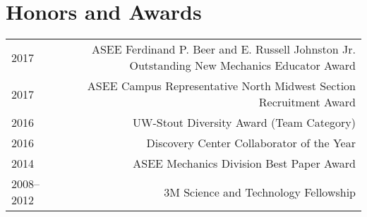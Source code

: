 \section*{Honors and Awards}
\begin{tabular}{L!{\VRule}R}
2017&ASEE Ferdinand P. Beer and E. Russell Johnston Jr. Outstanding New Mechanics Educator Award\\
2017&ASEE Campus Representative North Midwest Section Recruitment Award\\
2016&UW-Stout Diversity Award (Team Category)\\
2016&Discovery Center Collaborator of the Year\\
2014&ASEE Mechanics Division Best Paper Award\\
2008--2012&3M Science and Technology Fellowship\\
\end{tabular}